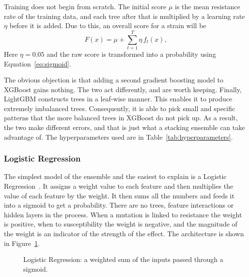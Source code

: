 Training does not begin from scratch. The initial score $\mu$ is the mean resistance rate of
the training data, and each tree after that is multiplied by a learning rate $\eta$ before it
is added. Due to this, an overall score for a strain will be
\begin{equation}
F(x) = \mu + \sum_{t=1}^{T} \eta\, f_t(x),
\label{eq:lgbm_score}
\end{equation}
Here $\eta = 0.05$ and the raw score is transformed into a probability using
Equation~\eqref{eq:sigmoid}.

\vspace{1em}

The obvious objection is that adding a second gradient boosting model to XGBoost gains nothing.
The two act differently, and are worth keeping. Finally, LightGBM constructs trees in a leaf-wise manner. This enables it to produce extremely imbalanced trees.
Consequently, it is able to pick small and specific patterns that the more balanced trees in
XGBoost do not pick up. As a result, the two make different errors, and that is just what a
stacking ensemble can take advantage of. The hyperparameters used are in
Table~\ref{tab:hyperparameters}.

\subsubsection{Logistic Regression}

The simplest model of the ensemble and the easiest to explain is a Logistic
Regression~\cite{hosmer2013alr}. It assigns a weight value to each feature and then multiplies
the value of each feature by the weight. It then sums all the numbers and feeds it into a
sigmoid to get a probability. There are no trees, feature interactions or hidden layers in the
process. When a mutation is linked to
resistance the weight is positive, when to susceptibility the weight is negative, and the
magnitude of the weight is an indicator of the strength of the effect. The architecture is
shown in Figure~\ref{fig:logistic_regression}.

\begin{figure}[H]
    \centering
    \resizebox{\textwidth}{!}{}
    \caption{Logistic Regression: a weighted sum of the inputs passed through a sigmoid.}
    \label{fig:logistic_regression}
\end{figure}

